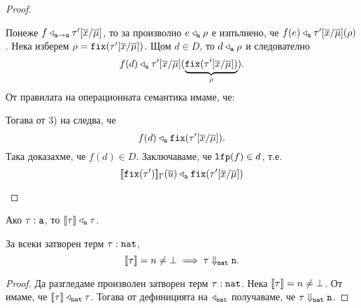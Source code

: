 \begin{proof}
\begin{itemize}
    Понеже $f \triangleleft_{\vv{a}\to\vv{a}} \tau'[\ov{x}/\ov{\mu}]$, то
    за произволно $e \triangleleft_{\vv{a}} \rho$ е изпълнено, че
    $f(e) \triangleleft_{\vv{a}} \tau'[\ov{x}/\ov{\mu}](\rho)$.
    Нека изберем $\rho = \fix(\tau'[\ov{x}/\ov{\mu}])$. Щом $d \in D$, то $d \triangleleft_{\vv{a}} \rho$ и следователно
    \[f(d) \triangleleft_{\vv{a}} \tau'[\ov{x}/\ov{\mu}](\underbrace{\fix(\tau'[\ov{x}/\ov{\mu}])}_{\rho}).\]
    От правилата на операционната семантика имаме, че:
    \begin{prooftree}
    \end{prooftree}
    Тогава от 3) на  следва, че
    \[f(d) \triangleleft_{\vv{a}} \fix(\tau'[\ov{x}/\ov{\mu}]).\]
    Така доказахме, че $f(d) \in D$.
    Заключаваме, че $\lfp(f) \in d$, т.е.
    \[\val{\fix(\tau')}_\Gamma(\ov{u}) \triangleleft_{\vv{a}} \fix(\tau'[\ov{x}/\ov{\mu}])\]
  \end{itemize}
\end{proof}

\begin{framed}
  \begin{corollary}\label{cr:pcf:fundamental}
    Ако $\tau : \vv{a}$, то $\val{\tau} \triangleleft_{\vv{a}} \tau$.
  \end{corollary}
\end{framed}

\begin{framed}
  \begin{theorem}\label{th:pcf:adequacy}
    За всеки затворен терм $\tau : \vv{nat}$, 
    \[\val{\tau} = n \neq \bot \implies \tau \Downarrow_{\vv{nat}} \vv{n}.\]
  \end{theorem}
\end{framed}
\begin{proof}
  Да разгледаме произволен затворен терм $\tau : \vv{nat}$.
  Нека $\val{\tau} = n \neq \bot$.
  От  имаме, че $\val{\tau} \triangleleft_{\vv{nat}} \tau$.
  Тогава от дефиницията на $\triangleleft_{\vv{nat}}$ получаваме, че $\tau \Downarrow_{\vv{nat}} \vv{n}$.
\end{proof}



